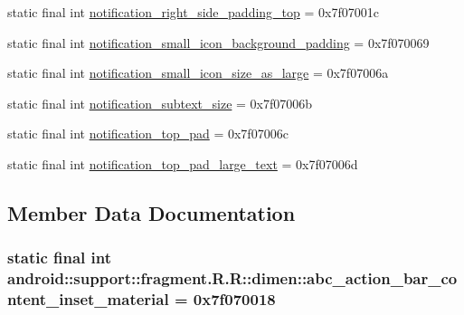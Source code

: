 \begin{CompactItemize}
static final int \hyperlink{classandroid_1_1support_1_1fragment_1_1_r_1_1dimen_0f59d45cd658a05b982809a4c999dcc3}{notification\_\-right\_\-side\_\-padding\_\-top} = 0x7f07001c
\item 
static final int \hyperlink{classandroid_1_1support_1_1fragment_1_1_r_1_1dimen_93e3f752108e808f1329203d10921b30}{notification\_\-small\_\-icon\_\-background\_\-padding} = 0x7f070069
\item 
static final int \hyperlink{classandroid_1_1support_1_1fragment_1_1_r_1_1dimen_36b2f3dc49c8f932cea36ec7fd5c3ccc}{notification\_\-small\_\-icon\_\-size\_\-as\_\-large} = 0x7f07006a
\item 
static final int \hyperlink{classandroid_1_1support_1_1fragment_1_1_r_1_1dimen_9098a00fe352541cb177725172e0d59c}{notification\_\-subtext\_\-size} = 0x7f07006b
\item 
static final int \hyperlink{classandroid_1_1support_1_1fragment_1_1_r_1_1dimen_897330e2cb2051beae888ca184c8a127}{notification\_\-top\_\-pad} = 0x7f07006c
\item 
static final int \hyperlink{classandroid_1_1support_1_1fragment_1_1_r_1_1dimen_627c997ff59c83e6b70896a7e30c4c05}{notification\_\-top\_\-pad\_\-large\_\-text} = 0x7f07006d
\end{CompactItemize}


\subsection{Member Data Documentation}
\hypertarget{classandroid_1_1support_1_1fragment_1_1_r_1_1dimen_c8468532644ff03e511a2d7306393c8c}{
\subsubsection[{abc\_\-action\_\-bar\_\-content\_\-inset\_\-material}]{\setlength{\rightskip}{0pt plus 5cm}static final int android::support::fragment.R.R::dimen::abc\_\-action\_\-bar\_\-content\_\-inset\_\-material = 0x7f070018}}
\label{classandroid_1_1support_1_1fragment_1_1_r_1_1dimen_c8468532644ff03e511a2d7306393c8c}


